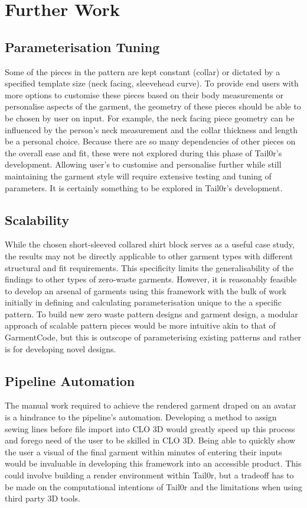 \section{Further Work}

\subsection{Parameterisation Tuning}
Some of the pieces in the pattern are kept constant (collar) or dictated by a specified template size (neck facing, sleevehead curve). To provide end users with more options to customise these pieces based on their body measurements or personalise aspects of the garment, the geometry of these pieces should be able to be chosen by user on input. For example, the neck facing piece geometry can be influenced by the person's neck measurement and the collar thickness and length be a personal choice. Because there are so many dependencies of other pieces on the overall ease and fit, these were not explored during this phase of Tail0r's development. Allowing user's to customise and personalise further while still maintaining the garment style will require extensive testing and tuning of parameters. It is certainly something to be explored in Tail0r's development.

\subsection{Scalability}
While the chosen short-sleeved collared shirt block serves as a useful case study, the results may not be directly applicable to other garment types with different structural and fit requirements. This specificity limits the generalisability of the findings to other types of zero-waste garments. However, it is reasonably feasible to develop an arsenal of garments using this framework with the bulk of work initially in defining and calculating parameterisation unique to the a specific pattern. To build new zero waste pattern designs and garment design, a modular approach of scalable pattern pieces would be more intuitive akin to that of GarmentCode, but this is outscope of parameterising existing patterns and rather is for developing novel designs.

\subsection{Pipeline Automation}
The manual work required to achieve the rendered garment draped on an avatar is a hindrance to the pipeline's automation. Developing a method to assign sewing lines before file import into CLO 3D would greatly speed up this process and forego need of the user to be skilled in CLO 3D. Being able to quickly show the user a visual of the final garment within minutes of entering their inputs would be invaluable in developing this framework into an accessible product. This could involve building a render environment within Tail0r, but a tradeoff has to be made on the computational intentions of Tail0r and the limitations when using third party 3D tools.

